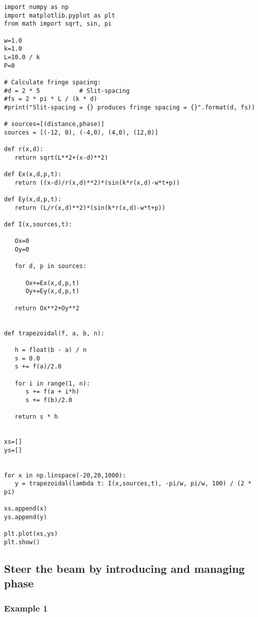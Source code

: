 \begin{Verbatim}[fontsize=\small,baselinestretch=0.9]
import numpy as np
import matplotlib.pyplot as plt
from math import sqrt, sin, pi

w=1.0
k=1.0
L=10.0 / k
P=0

# Calculate fringe spacing:
#d = 2 * 5           # Slit-spacing
#fs = 2 * pi * L / (k * d)
#print("Slit-spacing = {} produces fringe spacing = {}".format(d, fs))

# sources=[(distance,phase)]
sources = [(-12, 0), (-4,0), (4,0), (12,0)]

def r(x,d):
   return sqrt(L**2+(x-d)**2)

def Ex(x,d,p,t):
   return ((x-d)/r(x,d)**2)*(sin(k*r(x,d)-w*t+p))

def Ey(x,d,p,t):
   return (L/r(x,d)**2)*(sin(k*r(x,d)-w*t+p))

def I(x,sources,t):

   Ox=0
   Oy=0

   for d, p in sources:

      Ox+=Ex(x,d,p,t)
      Oy+=Ey(x,d,p,t)

   return Ox**2+Oy**2


def trapezoidal(f, a, b, n):

   h = float(b - a) / n
   s = 0.0
   s += f(a)/2.0

   for i in range(1, n):
      s += f(a + i*h)
      s += f(b)/2.0

   return s * h


xs=[]
ys=[]


for x in np.linspace(-20,20,1000):
   y = trapezoidal(lambda t: I(x,sources,t), -pi/w, pi/w, 100) / (2 * pi)

xs.append(x)
ys.append(y)

plt.plot(xs,ys)
plt.show()   
\end{Verbatim}

\subsection{Steer the beam by introducing and managing phase}

\subsubsection{Example 1}\label{code:phase_right}

